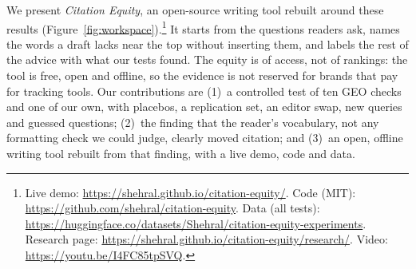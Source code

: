 We present \emph{Citation Equity}, an open-source writing tool rebuilt around these results (Figure~\ref{fig:workspace}).\footnote{Live demo: \url{https://shehral.github.io/citation-equity/}. Code (MIT): \url{https://github.com/shehral/citation-equity}. Data (all tests): \url{https://huggingface.co/datasets/Shehral/citation-equity-experiments}. Research page: \url{https://shehral.github.io/citation-equity/research/}.\label{fn:links} Video: \url{https://youtu.be/I4FC85tpSVQ}.}
It starts from the questions readers ask, names the words a draft lacks near the top without inserting them, and labels the rest of the advice with what our tests found.
The equity is of access, not of rankings: the tool is free, open and offline, so the evidence is not reserved for brands that pay for tracking tools.
Our contributions are (1)~a controlled test of ten GEO checks and one of our own, with placebos, a replication set, an editor swap, new queries and guessed questions; (2)~the finding that the reader's vocabulary, not any formatting check we could judge, clearly moved citation; and (3)~an open, offline writing tool rebuilt from that finding, with a live demo, code and data.
